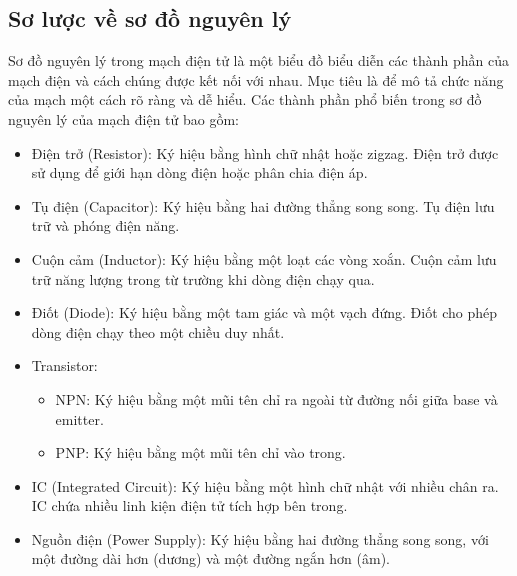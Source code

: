         \subsection{Sơ lược về sơ đồ nguyên lý}
            Sơ đồ nguyên lý trong mạch điện tử là một biểu đồ biểu diễn các thành phần của
            mạch điện và cách chúng được kết nối với nhau. Mục tiêu là để mô tả chức năng của
            mạch một cách rõ ràng và dễ hiểu. Các thành phần phổ biến trong sơ đồ nguyên lý của
            mạch điện tử bao gồm:
            \begin{itemize}
                \item Điện trở (Resistor): Ký hiệu bằng hình chữ nhật hoặc zigzag. Điện trở được sử dụng để giới hạn dòng điện hoặc phân chia điện áp.
                \item Tụ điện (Capacitor): Ký hiệu bằng hai đường thẳng song song. Tụ điện lưu trữ và phóng điện năng.
                \item Cuộn cảm (Inductor): Ký hiệu bằng một loạt các vòng xoắn. Cuộn cảm lưu trữ năng lượng trong từ trường khi dòng điện chạy qua.
                \item Điốt (Diode): Ký hiệu bằng một tam giác và một vạch đứng. Điốt cho phép dòng điện chạy theo một chiều duy nhất.
                \item Transistor:
                \begin{itemize}
                    \item NPN: Ký hiệu bằng một mũi tên chỉ ra ngoài từ đường nối giữa base và emitter.
                    \item PNP: Ký hiệu bằng một mũi tên chỉ vào trong.
                \end{itemize}
                \item IC (Integrated Circuit): Ký hiệu bằng một hình chữ nhật với nhiều chân ra. IC chứa nhiều linh kiện điện tử tích hợp bên trong.
                \item Nguồn điện (Power Supply): Ký hiệu bằng hai đường thẳng song song, với một đường dài hơn (dương) và một đường ngắn hơn (âm).
            \end{itemize}
